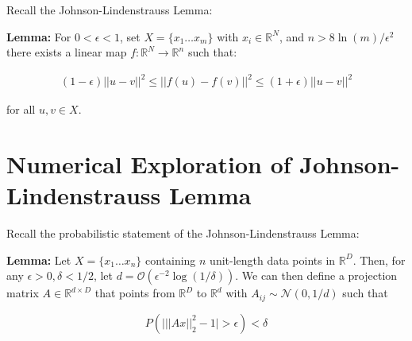 \documentclass{article}
\begin{document}
    Recall the Johnson-Lindenstrauss Lemma:

    \textbf{Lemma:} For $0<\epsilon<1$, set $X= \{ x_1 \ldots x_m \}$ with $x_i \in \mathbb{R}^N$, and $ n > 8 \ln(m)/ \epsilon^2$ there exists a linear map $f: \mathbb{R}^N \rightarrow \mathbb{R}^n$ such that:

    \begin{align*}
        (1 - \epsilon) ||u - v||^2 \leq ||f(u) - f(v)||^2 \leq (1 + \epsilon) ||u - v||^2
    \end{align*}

    for all $u,v \in X$.

\section{Numerical Exploration of Johnson-Lindenstrauss Lemma}

    Recall the probabilistic statement of the Johnson-Lindenstrauss Lemma:

    \textbf{Lemma:} Let $X=\{x_1 \ldots x_n\}$ containing $n$ unit-length data points in  $\mathbb{R}^D$. Then, for any $\epsilon > 0, \delta < 1/2$, let $d = \mathcal{O}(\epsilon^{-2}\log(1/\delta))$. We can then define a projection matrix $A \in \mathbb{R}^{d \times D}$ that points from $\mathbb{R}^D$ to $\mathbb{R}^d$ with $A_{ij} \sim \mathcal{N}(0, 1/d)$ such that

    \begin{equation*}
        P\left( \Big| ||Ax||_2^2 - 1 \Big| > \epsilon \right) < \delta
    \end{equation*}
\end{document}
